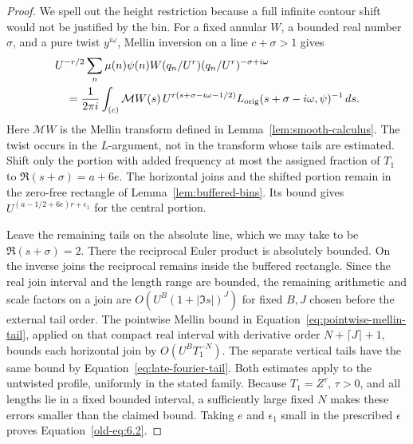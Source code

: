 \documentclass[11pt,a4paper]{article}
\numberwithin{equation}{section}
\numberwithin{figure}{section}
\theoremstyle{definition}
\theoremstyle{remark}
\begin{document}
\begin{proof}
We spell out the height restriction because a full infinite contour
shift would not be justified by the bin.  For a fixed annular \(W\),
a bounded real number \(\sigma\), and a pure twist \(y^{i\omega}\),
Mellin inversion on a line \(c+\sigma>1\) gives
\[
 \begin{split}
 &U^{-r/2}\sum_n\mu(n)\psi(n)
       W(q_n/U^r)(q_n/U^r)^{-\sigma+i\omega}\\
 &\quad=\frac1{2\pi i}\int_{(c)}
  \mathcal MW(s)\,
  U^{r(s+\sigma-i\omega-1/2)}
  L_{\rm orig}(s+\sigma-i\omega,\psi)^{-1}\,ds.
 \end{split}
\]
Here \(\mathcal MW\) is the Mellin transform defined in
Lemma~\ref{lem:smooth-calculus}.  The twist occurs in the
\(L\)-argument, not in the transform whose tails are estimated.
Shift only the portion with added frequency at most the assigned
fraction of \(T_1\) to \(\Re(s+\sigma)=a+6e\).
The horizontal joins and the shifted portion remain in the
zero-free rectangle of Lemma~\ref{lem:buffered-bins}.  Its bound
gives \(U^{(a-1/2+6e)r+\epsilon_1}\) for the central portion.

Leave the remaining tails on the absolute line, which we may take
to be \(\Re(s+\sigma)=2\).  There the reciprocal Euler product is
absolutely bounded.  On the inverse joins the reciprocal remains
inside the buffered rectangle.  Since the real join interval and
the length range are bounded, the remaining arithmetic and scale
factors on a join are \(O(U^B(1+|\Im s|)^J)\) for fixed \(B,J\)
chosen before the external tail order.  The pointwise Mellin bound
in Equation~\eqref{eq:pointwise-mellin-tail}, applied on that compact
real interval with derivative order \(N+\lceil J\rceil+1\), bounds
each horizontal join by \(O(U^B T_1^{-N})\).  The separate vertical
tails have the same bound by Equation~\eqref{eq:late-fourier-tail}.
Both estimates apply to the untwisted profile, uniformly in the
stated family.  Because \(T_1=Z^\tau\), \(\tau>0\), and all lengths
lie in a fixed bounded interval, a sufficiently large fixed \(N\)
makes these errors smaller than the claimed bound.
Taking \(e\) and \(\epsilon_1\) small in the prescribed
\(\epsilon\) proves Equation~\eqref{old-eq:6.2}.


\end{proof}
\end{document}
